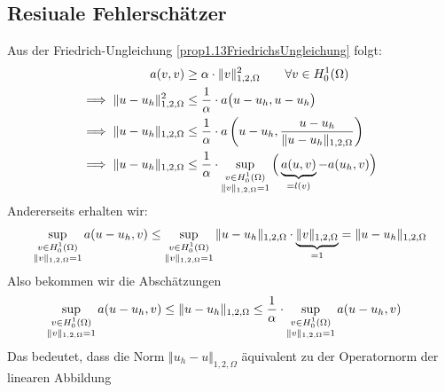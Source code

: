\subsection*{Resiuale Fehlerschätzer}
Aus der Friedrich-Ungleichung \ref{prop1.13FriedrichsUngleichung} folgt:
\begin{align*}
	a(v,v)&\geq\alpha\cdot\Vert v\Vert^2_{1,2,\Omega}\qquad\forall v\in H^1_0(\Omega)\\
	\implies
	\Vert u-u_h\Vert^2_{1,2,\Omega}
	&\leq
	\frac{1}{\alpha}\cdot a\big(u-u_h,u-u_h\big)\\
	\implies
	\Vert u-u_h\Vert_{1,2,\Omega}
	&\leq\frac{1}{\alpha}\cdot a\left(u-u_h,\frac{u-u_h}{\Vert u-u_h\Vert_{1,2,\Omega}}\right)\\
	\implies
	\Vert u-u_h\Vert_{1,2,\Omega}
	&\leq\frac{1}{\alpha}\cdot\sup\limits_{\begin{subarray}{c}v\in H^1_0(\Omega)\\\Vert v\Vert_{1,2,\Omega}=1\end{subarray}}\Big(\underbrace{a(u,v)}_{=l(v)}-a(u_h,v)\Big)
\end{align*}
Andererseits erhalten wir:
\begin{align*}
	\sup\limits_{\begin{subarray}{c}v\in H^1_0(\Omega)\\\Vert v\Vert_{1,2,\Omega}=1\end{subarray}} a(u-u_h,v)
	&\leq
	\sup\limits_{\begin{subarray}{c}v\in H^1_0(\Omega)\\\Vert v\Vert_{1,2,\Omega}=1\end{subarray}}
	\Vert u-u_h\Vert_{1,2,\Omega}\cdot\underbrace{\Vert v\Vert_{1,2,\Omega}}_{=1}
	=\Vert u-u_h\Vert_{1,2,\Omega}\\
\end{align*}
Also bekommen wir die Abschätzungen
\begin{align*}
	\sup\limits_{\begin{subarray}{c}v\in H^1_0(\Omega)\\\Vert v\Vert_{1,2,\Omega}=1\end{subarray}} a(u-u_h,v)
	&\leq
	\Vert u-u_h\Vert_{1,2,\Omega}
	\leq\frac{1}{\alpha}\cdot\sup\limits_{\begin{subarray}{c}v\in H^1_0(\Omega)\\\Vert v\Vert_{1,2,\Omega}=1\end{subarray}} a(u-u_h,v)
\end{align*}
Das bedeutet, dass die Norm $\Vert u_h-u\Vert_{1,2,\Omega}$ äquivalent zu der Operatornorm der linearen Abbildung
